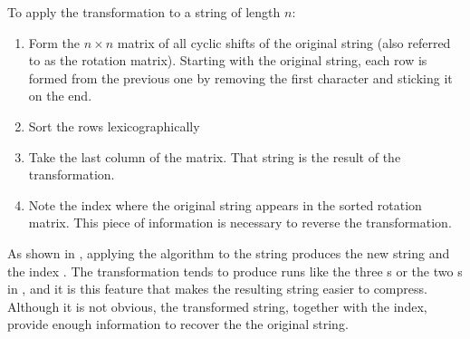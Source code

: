\documentclass[sigplan,10pt,anonymous,review]{thesis}
\begin{document}
To apply the transformation to a string of length $n$:
\begin{enumerate}
\item Form the \(n \times n\) matrix of all cyclic shifts of the
  original string (also referred to as the rotation matrix). Starting
  with the original string, each row is formed from the previous one
  by removing the first character and sticking it on the end.
\item Sort the rows lexicographically
\item Take the last column of the matrix. That string is the result of the transformation.
\item Note the index where the original string appears in the sorted
  rotation matrix. This piece of information is necessary to reverse
  the transformation.
\end{enumerate}
As shown in , applying the algorithm to the string
 produces the new string  and the
index . The transformation tends to produce runs like the three
s or the two s in , and it is this
feature that makes the resulting string easier to compress. Although
it is not obvious, the transformed string, together with the index,
provide enough information to recover the the original string.
\end{document}
